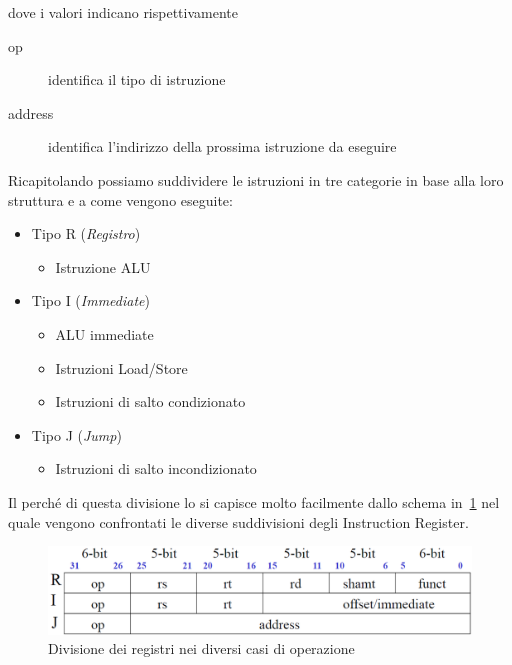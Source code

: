 dove i valori indicano rispettivamente
\begin{description}
\item[op] identifica il tipo di istruzione
\item[address] identifica l'indirizzo della prossima istruzione da eseguire
\end{description}
Ricapitolando possiamo suddividere le istruzioni in tre categorie in base alla loro struttura e a come vengono eseguite:
\begin{itemize}
\item Tipo R (\emph{Registro})
\begin{itemize}
\item Istruzione ALU
\end{itemize}
\item Tipo I (\emph{Immediate})
\begin{itemize}
\item ALU immediate
\item Istruzioni Load/Store
\item Istruzioni di salto condizionato
\end{itemize}
\item Tipo J (\emph{Jump})
\begin{itemize}
\item Istruzioni di salto incondizionato
\end{itemize}
\end{itemize}
Il perché di questa divisione lo si capisce molto facilmente dallo schema in \figurename\,\ref{fig:rij} nel quale vengono confrontati le diverse suddivisioni degli Instruction Register.
\begin{figure}[htb]
\centering
\includegraphics[scale=0.5]{img/rij.png}
\caption{Divisione dei registri nei diversi casi di operazione}\label{fig:rij}
\end{figure}
